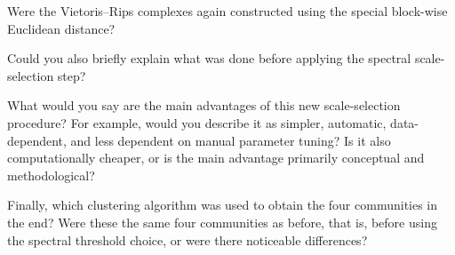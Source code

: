 \documentclass[11pt,a4paper]{article}
\begin{document}
Were the Vietoris--Rips complexes again constructed using the special block-wise
Euclidean distance?

Could you also briefly explain what was done before applying the spectral
scale-selection step?

What would you say are the main advantages of this new scale-selection procedure?
For example, would you describe it as simpler, automatic, data-dependent, and less
dependent on manual parameter tuning? Is it also computationally cheaper, or is
the main advantage primarily conceptual and methodological?

Finally, which clustering algorithm was used to obtain the four communities in the
end? Were these the same four communities as before, that is, before using the
spectral threshold choice, or were there noticeable differences?
\end{document}
